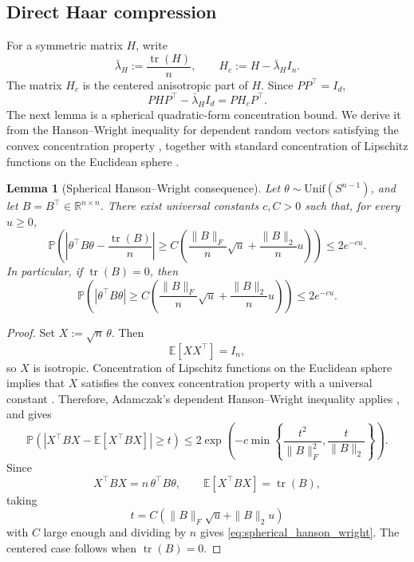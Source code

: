 \documentclass{article}
\newtheorem{lemma}{Lemma}
\begin{document}
\subsection{Direct Haar compression}

For a symmetric matrix \(H\), write
\[
\bar\lambda_H:=\frac{\operatorname{tr}(H)}{n},
\qquad
H_c:=H-\bar\lambda_H I_n.
\]
The matrix \(H_c\) is the centered anisotropic part of \(H\). Since
\(PP^\top=I_d\),
\[
PHP^\top-\bar\lambda_H I_d=PH_cP^\top.
\]
The next lemma is a spherical quadratic-form concentration bound. We derive it
from the Hanson--Wright inequality for dependent random vectors satisfying the
convex concentration property \cite{Adamczak2015DependentHW}, together with
standard concentration of Lipschitz functions on the Euclidean sphere
\cite{Ledoux2001Concentration}.
\begin{lemma}[Spherical Hanson--Wright consequence]
\label{lem:spherical_hanson_wright}
Let \(\theta\sim\mathrm{Unif}(S^{n-1})\), and let
\(B=B^\top\in\mathbb R^{n\times n}\). There exist universal constants
\(c,C>0\) such that, for every \(u\ge0\),
\begin{equation}
\mathbb P\!\left(
\left|
\theta^\top B\theta-\frac{\operatorname{tr}(B)}{n}
\right|
\ge
C\left(
\frac{\|B\|_F}{n}\sqrt u
+
\frac{\|B\|_2}{n}u
\right)
\right)
\le
2e^{-cu}.
\label{eq:spherical_hanson_wright}
\end{equation}
In particular, if \(\operatorname{tr}(B)=0\), then
\begin{equation}
\mathbb P\!\left(
|\theta^\top B\theta|
\ge
C\left(
\frac{\|B\|_F}{n}\sqrt u
+
\frac{\|B\|_2}{n}u
\right)
\right)
\le
2e^{-cu}.
\label{eq:spherical_hanson_wright_centered}
\end{equation}
\end{lemma}

\begin{proof}
Set \(X:=\sqrt n\,\theta\). Then
\[
\mathbb E[XX^\top]=I_n,
\]
so \(X\) is isotropic. Concentration of Lipschitz functions on the Euclidean
sphere implies that \(X\) satisfies the convex concentration property with a
universal constant \cite{Ledoux2001Concentration}. Therefore, Adamczak's
dependent Hanson--Wright inequality applies \cite{Adamczak2015DependentHW},
and gives
\[
\mathbb P\!\left(
|X^\top B X-\mathbb E[X^\top B X]|
\ge t
\right)
\le
2\exp\!\left(
-c\min\left\{
\frac{t^2}{\|B\|_F^2},
\frac{t}{\|B\|_2}
\right\}
\right).
\]
Since
\[
X^\top B X=n\,\theta^\top B\theta,
\qquad
\mathbb E[X^\top B X]=\operatorname{tr}(B),
\]
taking
\[
t=C\left(\|B\|_F\sqrt u+\|B\|_2u\right)
\]
with \(C\) large enough and dividing by \(n\) gives
\eqref{eq:spherical_hanson_wright}. The centered case follows when
\(\operatorname{tr}(B)=0\).
\end{proof}
\end{document}

